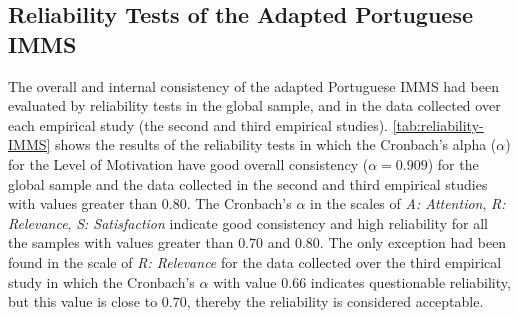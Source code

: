\subsection{Reliability Tests of the Adapted Portuguese IMMS}

The overall and internal consistency of the adapted Portuguese IMMS had been evaluated by reliability tests in the global sample, and in the data collected over each empirical study (the second and third empirical studies). \autoref{tab:reliability-IMMS} shows the results of the reliability tests in which the Cronbach's alpha ($\alpha$) for the Level of Motivation have good overall consistency ($\alpha=0.909$) for the global sample and the data collected in the second and third empirical studies with values greater than 0.80. The Cronbach's $\alpha$ in the scales of \emph{A: Attention}, \emph{R: Relevance}, \emph{S: Satisfaction} indicate good consistency and high reliability for all the samples with values greater than $0.70$ and $0.80$. The only exception had been found in the scale of \emph{R: Relevance} for the data collected over the third empirical study in which the Cronbach's $\alpha$ with value $0.66$ indicates questionable reliability, but this value is close to $0.70$, thereby the reliability is considered acceptable.


